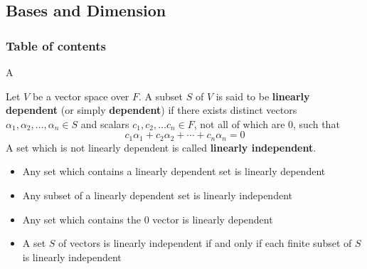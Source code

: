 \documentclass[8pt]{beamer}
\newcommand{\tb}[1]{\textbf{#1}}
\begin{document}
\subsection{Bases and Dimension}

\begin{frame}
    \frametitle{Table of contents}
    \tableofcontents[currentsubsection]
\end{frame}

\begin{frame}{A}
    \begin{definition} 
        Let $V$ be a vector space over $F$. A subset $S$ of $V$ is said to be \tb{linearly dependent} (or simply \tb{dependent}) if there exists distinct vectors $\alpha_1, \alpha_2, \dots, \alpha_n \in S$ and scalars $c_1, c_2, \dots c_n \in F$, not all of which are $0$, such that 
        \[
        c_1 \alpha_1 + c_2 \alpha_2 + \cdots + c_n \alpha_n = 0
        \]
        A set which is not linearly dependent is called \tb{linearly independent}.
    \end{definition}
    \begin{corollary}
        \begin{itemize}
            \item Any set which contains a linearly dependent set is linearly dependent
            \item Any subset of a linearly dependent set is linearly independent
            \item Any set which contains the $0$ vector is linearly dependent
            \item A set $S$ of vectors is linearly independent if and only if each finite subset of $S$ is linearly independent
        \end{itemize}
    \end{corollary}
\end{frame}
\end{document}
